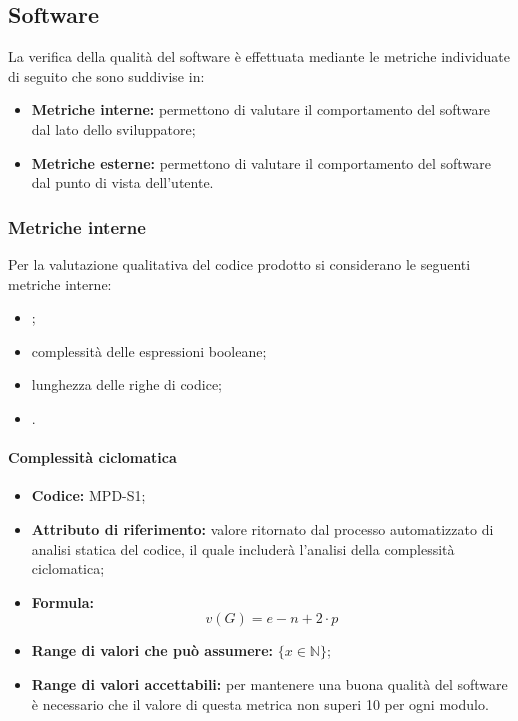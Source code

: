 \subsection{Software}
La verifica della qualità del software è effettuata mediante le metriche individuate di seguito che sono suddivise in:

\begin{itemize}
    \item \textbf{Metriche interne:} permettono di valutare il comportamento del software dal lato dello sviluppatore;
    \item \textbf{Metriche esterne:} permettono di valutare il comportamento del software dal punto di vista dell'utente.
\end{itemize}


\subsubsection{Metriche interne}
\label{_metricheQualitaCodice}
Per la valutazione qualitativa del codice prodotto si considerano le seguenti metriche interne:
\begin{itemize}
    \item {};
    \item complessità delle espressioni booleane;
    \item lunghezza delle righe di codice;
    \item {}.
\end{itemize}

\paragraph{Complessità ciclomatica}
\begin{itemize}
    \item \textbf{Codice:} MPD-S1;
    \item \textbf{Attributo di riferimento:} valore ritornato dal processo automatizzato di analisi statica del codice, il quale includerà l'analisi della complessità ciclomatica;
    \item \textbf{Formula:} \[ v(G)=e-n+2\cdot p \]
    \item \textbf{Range di valori che può assumere:} $\{x \in \mathbb{N} \}$;
    \item \textbf{Range di valori accettabili:} per mantenere una buona qualità del software è necessario che il valore di questa metrica non superi
    10 per ogni modulo.
\end{itemize}

